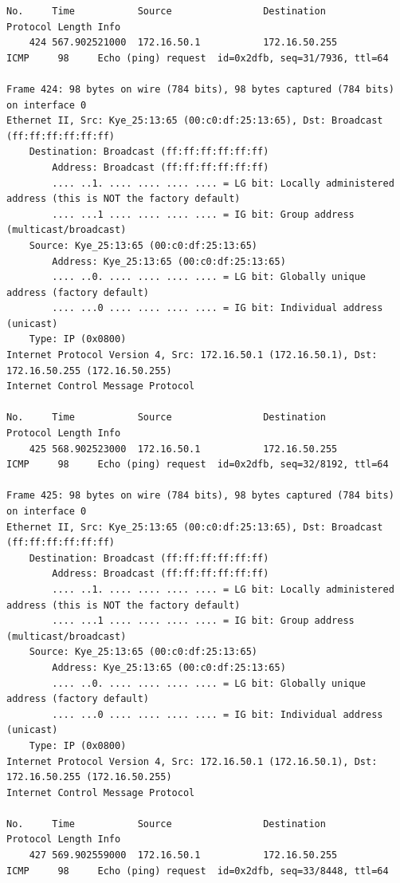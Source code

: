 \documentclass[a4paper,11pt]{article}
\begin{document}
\begin{lstlisting}
No.     Time           Source                Destination           Protocol Length Info
    424 567.902521000  172.16.50.1           172.16.50.255         ICMP     98     Echo (ping) request  id=0x2dfb, seq=31/7936, ttl=64

Frame 424: 98 bytes on wire (784 bits), 98 bytes captured (784 bits) on interface 0
Ethernet II, Src: Kye_25:13:65 (00:c0:df:25:13:65), Dst: Broadcast (ff:ff:ff:ff:ff:ff)
    Destination: Broadcast (ff:ff:ff:ff:ff:ff)
        Address: Broadcast (ff:ff:ff:ff:ff:ff)
        .... ..1. .... .... .... .... = LG bit: Locally administered address (this is NOT the factory default)
        .... ...1 .... .... .... .... = IG bit: Group address (multicast/broadcast)
    Source: Kye_25:13:65 (00:c0:df:25:13:65)
        Address: Kye_25:13:65 (00:c0:df:25:13:65)
        .... ..0. .... .... .... .... = LG bit: Globally unique address (factory default)
        .... ...0 .... .... .... .... = IG bit: Individual address (unicast)
    Type: IP (0x0800)
Internet Protocol Version 4, Src: 172.16.50.1 (172.16.50.1), Dst: 172.16.50.255 (172.16.50.255)
Internet Control Message Protocol

No.     Time           Source                Destination           Protocol Length Info
    425 568.902523000  172.16.50.1           172.16.50.255         ICMP     98     Echo (ping) request  id=0x2dfb, seq=32/8192, ttl=64

Frame 425: 98 bytes on wire (784 bits), 98 bytes captured (784 bits) on interface 0
Ethernet II, Src: Kye_25:13:65 (00:c0:df:25:13:65), Dst: Broadcast (ff:ff:ff:ff:ff:ff)
    Destination: Broadcast (ff:ff:ff:ff:ff:ff)
        Address: Broadcast (ff:ff:ff:ff:ff:ff)
        .... ..1. .... .... .... .... = LG bit: Locally administered address (this is NOT the factory default)
        .... ...1 .... .... .... .... = IG bit: Group address (multicast/broadcast)
    Source: Kye_25:13:65 (00:c0:df:25:13:65)
        Address: Kye_25:13:65 (00:c0:df:25:13:65)
        .... ..0. .... .... .... .... = LG bit: Globally unique address (factory default)
        .... ...0 .... .... .... .... = IG bit: Individual address (unicast)
    Type: IP (0x0800)
Internet Protocol Version 4, Src: 172.16.50.1 (172.16.50.1), Dst: 172.16.50.255 (172.16.50.255)
Internet Control Message Protocol

No.     Time           Source                Destination           Protocol Length Info
    427 569.902559000  172.16.50.1           172.16.50.255         ICMP     98     Echo (ping) request  id=0x2dfb, seq=33/8448, ttl=64


\end{lstlisting}
\end{document}

